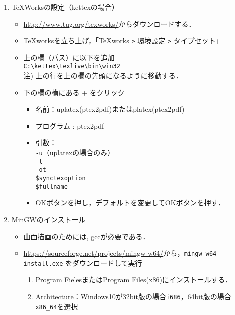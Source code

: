 \documentclass{ujarticle}
\begin{document}
\begin{enumerate}[\bf\large 1.]
\item TeXWorksの設定（kettexの場合）
  \begin{itemize}
  \item \url{http://www.tug.org/texworks/}からダウンロードする．
   \item TeXworksを立ち上げ，「TeXworks \verb|>| 環境設定 \verb|>| タイプセット」
  \item 上の欄（パス）に以下を追加\\
  \hspace*{5mm}\verb|C:\kettex\texlive\bin\win32|\\
  \hspace*{10mm}注) 上の行を上の欄の先頭になるように移動する．
  \item 下の欄の横にある + をクリック
    \begin{itemize}
    \item 名前：uplatex(ptex2pdf)またはplatex(ptex2pdf)
    \item プログラム : ptex2pdf
    \item 引数：\\
    \hspace*{10mm} \verb|-u|（uplatexの場合のみ）\\
    \hspace*{10mm} \verb|-l|\\
    \hspace*{10mm} \verb|-ot|\\
    \hspace*{10mm}  \verb|$synctexoption|\\
    \hspace*{10mm}  \verb|$fullname|
    \item[]OKボタンを押し，デフォルトを変更してOKボタンを押す．
    \end{itemize}
  \end{itemize}

\item MinGWのインストール
  \begin{itemize}
    \item 曲面描画のためには, gccが必要である．
    \item \url{https://sourceforge.net/projects/mingw-w64/}から，\verb|mingw-w64-install.exe|
    をダウンロードして実行
  \begin{enumerate}[(1)]
  \item Program FielesまたはProgram Files(x86)にインストールする．
  \item Architecture：Windows10が32bit版の場合\verb|i686|，64bit版の場合\verb|x86_64|を選択
  \end{enumerate}
  \end{itemize}


\end{enumerate}
\end{document}
